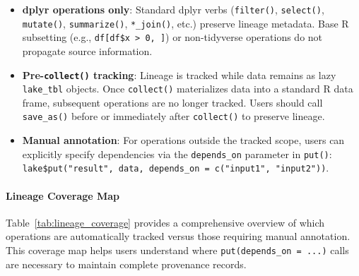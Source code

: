 \documentclass[11pt,a4paper]{article}
\begin{document}
\begin{itemize}
    \item \textbf{dplyr operations only}: Standard dplyr verbs (\texttt{filter()}, \texttt{select()}, \texttt{mutate()}, \texttt{summarize()}, \texttt{*\_join()}, etc.) preserve lineage metadata. Base R subsetting (e.g., \texttt{df[df\$x > 0, ]}) or non-tidyverse operations do not propagate source information.
    \item \textbf{Pre-\texttt{collect()} tracking}: Lineage is tracked while data remains as lazy \texttt{lake\_tbl} objects. Once \texttt{collect()} materializes data into a standard R data frame, subsequent operations are no longer tracked. Users should call \texttt{save\_as()} before or immediately after \texttt{collect()} to preserve lineage.
    \item \textbf{Manual annotation}: For operations outside the tracked scope, users can explicitly specify dependencies via the \texttt{depends\_on} parameter in \texttt{put()}: \texttt{lake\$put("result", data, depends\_on = c("input1", "input2"))}.
\end{itemize}

\paragraph{Lineage Coverage Map}
Table~\ref{tab:lineage_coverage} provides a comprehensive overview of which operations are automatically tracked versus those requiring manual annotation. This coverage map helps users understand where \texttt{put(depends\_on = ...)} calls are necessary to maintain complete provenance records.
\end{document}

